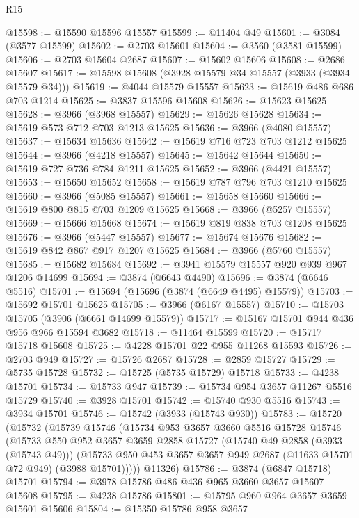 \begin{lexlean}{R15}
\begin{coremodule}
@15598 := @15590 @15596 @15557
@15599 := @11404 @49
@15601 := @3084 (@3577 @15599)
@15602 := @2703 @15601
@15604 := @3560 (@3581 @15599)
@15606 := @2703 @15604 @2687
@15607 := @15602 @15606
@15608 := @2686 @15607
@15617 := @15598 @15608 (@3928 @15579 @34 @15557 (@3933 (@3934 @15579 @34)))
@15619 := @4044 @15579 @15557
@15623 := @15619 @486 @686 @703 @1214
@15625 := @3837 @15596 @15608
@15626 := @15623 @15625
@15628 := @3966 (@3968 @15557)
@15629 := @15626 @15628
@15634 := @15619 @573 @712 @703 @1213 @15625
@15636 := @3966 (@4080 @15557)
@15637 := @15634 @15636
@15642 := @15619 @716 @723 @703 @1212 @15625
@15644 := @3966 (@4218 @15557)
@15645 := @15642 @15644
@15650 := @15619 @727 @736 @784 @1211 @15625
@15652 := @3966 (@4421 @15557)
@15653 := @15650 @15652
@15658 := @15619 @787 @796 @703 @1210 @15625
@15660 := @3966 (@5085 @15557)
@15661 := @15658 @15660
@15666 := @15619 @800 @815 @703 @1209 @15625
@15668 := @3966 (@5257 @15557)
@15669 := @15666 @15668
@15674 := @15619 @819 @838 @703 @1208 @15625
@15676 := @3966 (@5447 @15557)
@15677 := @15674 @15676
@15682 := @15619 @842 @867 @917 @1207 @15625
@15684 := @3966 (@5760 @15557)
@15685 := @15682 @15684
@15692 := @3941 @15579 @15557 @920 @939 @967 @1206 @14699
@15694 := @3874 (@6643 @4490)
@15696 := @3874 (@6646 @5516)
@15701 := @15694 (@15696 (@3874 (@6649 @4495) @15579))
@15703 := @15692 @15701 @15625
@15705 := @3966 (@6167 @15557)
@15710 := @15703 @15705 (@3906 (@6661 @14699 @15579))
@15717 := @15167 @15701 @944 @436 @956 @966 @15594 @3682
@15718 := @11464 @15599
@15720 := @15717 @15718 @15608
@15725 := @4228 @15701 @22 @955 @11268 @15593
@15726 := @2703 @949
@15727 := @15726 @2687
@15728 := @2859 @15727
@15729 := @5735 @15728
@15732 := @15725 (@5735 @15729) @15718
@15733 := @4238 @15701
@15734 := @15733 @947
@15739 := @15734 @954 @3657 @11267 @5516 @15729
@15740 := @3928 @15701
@15742 := @15740 @930 @5516
@15743 := @3934 @15701
@15746 := @15742 (@3933 (@15743 @930))
@15783 := @15720
    (@15732
      (@15739
        @15746
        (@15734
          @953
          @3657
          @3660
          @5516
          @15728
          @15746
          (@15733
            @550
            @952
            @3657
            @3659
            @2858
            @15727
            (@15740 @49 @2858 (@3933 (@15743 @49)))
            (@15733 @950 @453 @3657 @3657 @949 @2687 (@11633 @15701 @72 @949) (@3988 @15701)))))
      @11326)
@15786 := @3874 (@6847 @15718) @15701
@15794 := @3978 @15786 @486 @436 @965 @3660 @3657 @15607 @15608
@15795 := @4238 @15786
@15801 := @15795 @960 @964 @3657 @3659 @15601 @15606
@15804 := @15350 @15786 @958 @3657

\end{coremodule}
\end{lexlean}
